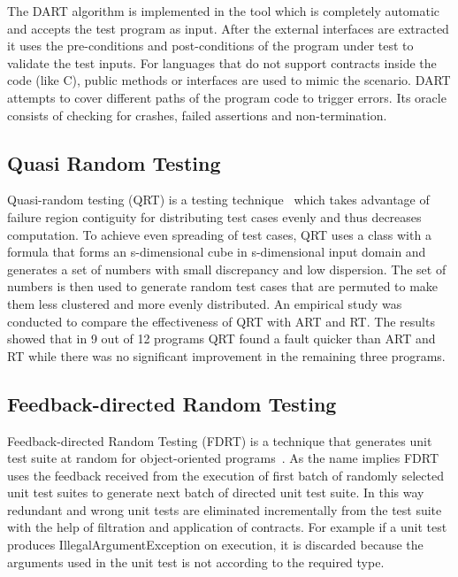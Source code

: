 The DART algorithm is implemented in the tool which is completely automatic and accepts the test program as input. After the external interfaces are extracted it uses the pre-conditions and post-conditions of the program under test to validate the test inputs. For languages that do not support contracts inside the code (like C), public methods or interfaces are used to mimic the scenario. DART attempts to cover different paths of the program code to trigger errors. Its oracle consists of checking for crashes, failed assertions and non-termination.



\subsection{Quasi Random Testing}
Quasi-random testing (QRT) is a testing technique~\cite{chen2007quasi} which takes advantage of failure region contiguity for distributing test cases evenly and thus decreases computation. %
To achieve even spreading of test cases, QRT uses a class with a formula that forms an s-dimensional cube in s-dimensional input domain and generates a set of numbers with small discrepancy and low dispersion. The set of numbers is then used to generate random test cases that are permuted to make them less clustered and more evenly distributed. An empirical study was conducted to compare the effectiveness of QRT with ART and RT. The results showed that in 9 out of 12 programs QRT found a fault quicker than ART and RT while there was no significant improvement in the remaining three programs.


\subsection{Feedback-directed Random Testing}
Feedback-directed Random Testing (FDRT) is a technique that generates unit test suite at random for object-oriented programs~\cite{pacheco2007randoop}. As the name implies FDRT uses the feedback received from the execution of first batch of randomly selected unit test suites to generate next batch of directed unit test suite. In this way redundant  and wrong unit tests are eliminated incrementally from the test suite with the help of filtration and application of contracts. For example if a unit test produces IllegalArgumentException on execution, it is discarded because the arguments used in the unit test is not according to the required type. 


